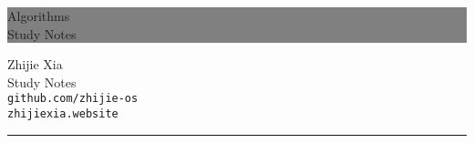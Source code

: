\begin{titlepage} %
	
	
	\colorbox{grey}{
		\parbox[t]{0.93\textwidth}{ %
			\parbox[t]{0.91\textwidth}{ %
				\raggedleft %
				\fontsize{50pt}{80pt}\selectfont %
				\vspace{0.4cm} %
				
				Algorithms\\
                Study Notes
				
				\vspace{0.4cm} %
			}
		}
	}
	
	\vfill %
	
	
	\parbox[t]{0.93\textwidth}{ %
		\raggedleft %
		\large %
		{\Large Zhijie Xia}\\[4pt] %
		Study Notes\\
		\texttt{github.com/zhijie-os}\\
		\texttt{zhijiexia.website}\\
		\hfill\rule{0.2\linewidth}{1pt}%
	}
	
\end{titlepage}
